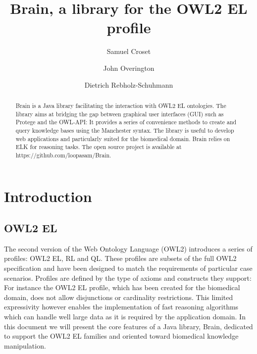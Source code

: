 \documentclass{llncs}
\begin{document}
%
\frontmatter          %
%
\pagestyle{headings}  %

\mainmatter              %
%
\title{Brain, a library for the OWL2 EL profile}
%
%
\author{Samuel Croset \and John Overington \and Dietrich Rebholz-Schuhmann}

\maketitle              %

\begin{abstract}
Brain is a Java library facilitating the interaction with OWL2 EL ontologies. 
The library aims at bridging the gap between graphical user interfaces (GUI) such as Protege and the OWL-API: It provides 
a series of convenience methods to create and query knowledge bases using the Manchester syntax. 
The library is useful to develop web applications and particularly suited for the biomedical domain. 
Brain relies on ELK for reasoning tasks. The open source project is available at https://github.com/loopasam/Brain.

\end{abstract}

\section{Introduction}
\subsection{OWL2 EL}
The second version of the Web Ontology Language (OWL2) introduces a series of profiles: OWL2 EL, RL and QL.
These profiles are subsets of the full OWL2 specification and have been designed to match the requirements of particular case scenarios.
Profiles are defined by the type of axioms and constructs they support: For instance the OWL2 EL profile, which has been 
created for the biomedical domain, does not allow 
disjunctions or cardinality restrictions. This limited expressivity however enables the implementation of fast reasoning algorithms which can
handle well large data as it is required by the application domain. In this document we will present the core features of a 
Java library, Brain, dedicated to support the OWL2 EL families and oriented toward biomedical knowledge manipulation.
\end{document}
